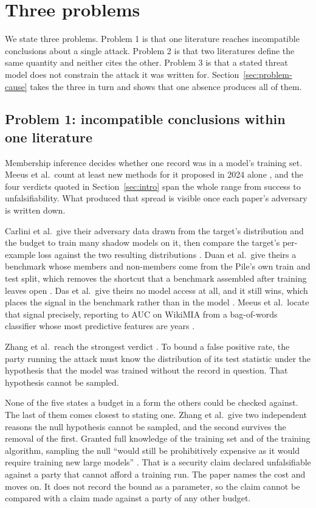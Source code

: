 \section{Three problems}
\label{sec:problem}

We state three problems. Problem 1 is that one literature reaches incompatible
conclusions about a single attack. Problem 2 is that two literatures define the
same quantity and neither cites the other. Problem 3 is that a stated threat model
does not constrain the attack it was written for. Section~\ref{sec:problem-cause}
takes the three in turn and shows that one absence produces all of them.

\subsection{Problem 1: incompatible conclusions within one literature}
\label{sec:problem-one}

Membership inference decides whether one record was in a model's training set.
Meeus et al.\ count at least \MIAnewMethods{} new methods for it proposed in 2024
alone \cite{MSJFRM25}, and the four verdicts quoted in Section~\ref{sec:intro} span
the whole range from success to unfalsifiability. What produced that spread is
visible once each paper's adversary is written down.

Carlini et al.\ give their adversary data drawn from the target's distribution and
the budget to train many shadow models on it, then compare the target's per-example
loss against the two resulting distributions \cite{CCNSTT22}. Duan et al.\ give
theirs a benchmark whose members and non-members come from the Pile's own train and
test split, which removes the shortcut that a benchmark assembled after training
leaves open \cite{DSMMSZTCEH24}. Das et al.\ give theirs no model access at all,
and it still wins, which places the signal in the benchmark rather than in the
model \cite{DZT25}. Meeus et al.\ locate that signal precisely, reporting
\MIAwikiLo{} to \MIAwikiHi{} AUC on WikiMIA from a bag-of-words classifier whose
most predictive features are years \cite{MSJFRM25}.

Zhang et al.\ reach the strongest verdict \cite{ZDKT25}. To bound a false positive
rate, the party running the attack must know the distribution of its test statistic
under the hypothesis that the model was trained without the record in question.
That hypothesis cannot be sampled.

None of the five states a budget in a form the others could be checked
against. The last of them comes closest to stating one. Zhang et al.\ give two independent reasons the null hypothesis cannot be sampled, and the second survives the removal
of the first. Granted full knowledge of the training set and of the training
algorithm, sampling the null ``would still be prohibitively expensive as it would
require training new large models'' \cite{ZDKT25}. That is a security claim
declared unfalsifiable against a party that cannot afford a training run. The paper
names the cost and moves on. It does not record the bound as a parameter, so the
claim cannot be compared with a claim made against a party of any other budget.

